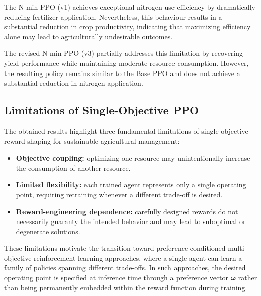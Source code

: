 The N-min PPO (v1) achieves exceptional nitrogen-use efficiency by dramatically reducing fertilizer application. Nevertheless, this behaviour results in a substantial reduction in crop productivity, indicating that maximizing efficiency alone may lead to agriculturally undesirable outcomes.

The revised N-min PPO (v3) partially addresses this limitation by recovering yield performance while maintaining moderate resource consumption. However, the resulting policy remains similar to the Base PPO and does not achieve a substantial reduction in nitrogen application.


\subsection{Limitations of Single-Objective PPO}

The obtained results highlight three fundamental limitations of single-objective reward shaping for sustainable agricultural management:
\begin{itemize}
  \item \textbf{Objective coupling:} optimizing one resource may unintentionally increase the consumption of another resource.
  \item \textbf{Limited flexibility:} each trained agent represents only a single operating point, requiring retraining whenever a different trade-off is desired.
  \item \textbf{Reward-engineering dependence:} carefully designed rewards do not necessarily guaranty the intended behavior and may lead to suboptimal or degenerate solutions.
\end{itemize}
These limitations motivate the transition toward preference-conditioned multi-objective reinforcement learning approaches, where a single agent can learn a family of policies spanning different trade-offs. In such approaches, the desired operating point is specified at inference time through a preference vector $\boldsymbol{\omega}$ rather than being permanently embedded within the reward function during training.
